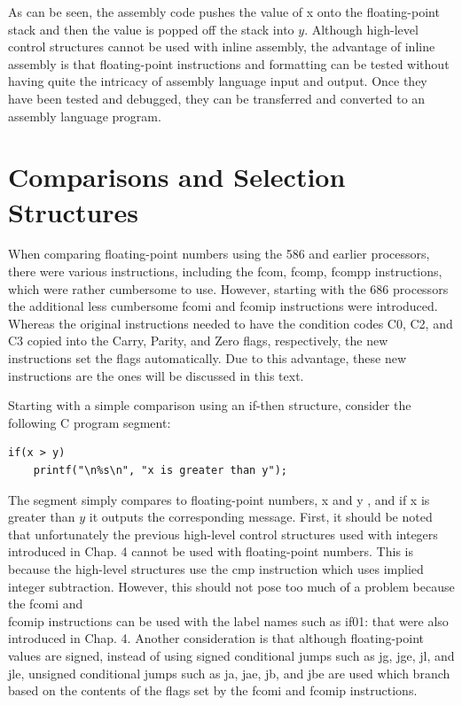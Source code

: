 \documentclass[10pt]{book}
\begin{document}
As can be seen, the assembly code pushes the value of x onto the floating-point stack and then the value is popped off the stack into $y$. Although high-level control structures cannot be used with inline assembly, the advantage of inline assembly is that floating-point instructions and formatting can be tested without having quite the intricacy of assembly language input and output. Once they have been tested and debugged, they can be transferred and converted to an assembly language program.

\section{Comparisons and Selection Structures}
When comparing floating-point numbers using the 586 and earlier processors, there were various instructions, including the fcom, fcomp, fcompp instructions, which were rather cumbersome to use. However, starting with the 686 processors the additional less cumbersome fcomi and fcomip instructions were introduced. Whereas the original instructions needed to have the condition codes C0, C2, and C3 copied into the Carry, Parity, and Zero flags, respectively, the new instructions set the flags automatically. Due to this advantage, these new instructions are the ones will be discussed in this text.

Starting with a simple comparison using an if-then structure, consider the following C program segment:

\begin{verbatim}
if(x > y)
    printf("\n%s\n", "x is greater than y");
\end{verbatim}

The segment simply compares to floating-point numbers, x and y , and if x is greater than $y$ it outputs the corresponding message. First, it should be noted that unfortunately the previous high-level control structures used with integers introduced in Chap. 4 cannot be used with floating-point numbers. This is because the high-level structures use the cmp instruction which uses implied integer subtraction. However, this should not pose too much of a problem because the fcomi and\\
fcomip instructions can be used with the label names such as if01: that were also introduced in Chap. 4. Another consideration is that although floating-point values are signed, instead of using signed conditional jumps such as jg, jge, jl, and jle, unsigned conditional jumps such as ja, jae, jb, and jbe are used which branch based on the contents of the flags set by the fcomi and fcomip instructions.
\end{document}
